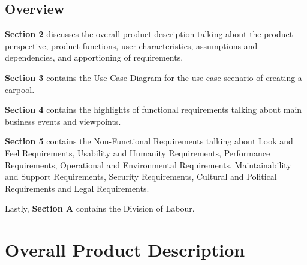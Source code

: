 \documentclass[]{article}
\begin{document}

\subsection{Overview}
\label{sub:overview}

\textbf{Section 2} discusses the overall product description talking about the product perspective, product functions, user characteristics, assumptions and dependencies, and apportioning of requirements. 

\textbf{Section 3} contains the Use Case Diagram for the use case scenario of creating a carpool. 

\textbf{Section 4} contains the highlights of functional requirements talking about main business events and viewpoints. 

\textbf{Section 5} contains the Non-Functional Requirements talking about Look and Feel Requirements, Usability and Humanity Requirements, Performance Requirements, Operational and Environmental Requirements, Maintainability and Support Requirements, Security Requirements, Cultural and Political Requirements and Legal Requirements. 

Lastly, \textbf{Section A} contains the Division of Labour.


\newpage
\section{Overall Product Description}
\label{sec:overall_description}

\end{document}

